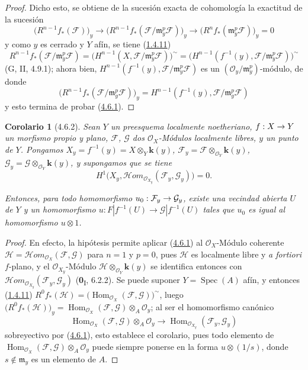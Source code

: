 \documentclass[10pt,oneside,openany]{book}
\theoremstyle{egaenv}\newtheorem*{env}{---}
\theoremstyle{egastatement}
\newtheorem*{corollary}{Corolario}
\theoremstyle{egadescription}
\renewcommand{\to}{\mathchoice{\longrightarrow}{\rightarrow}{\rightarrow}{\rightarrow}}
\begin{document}
\begin{proof}
Dicho esto, se obtiene de la sucesión exacta de cohomología la exactitud de la
sucesión
\[
\bigl(R^{n-1}f_*(\mathcal F)\bigr)_y
\longrightarrow
\bigl(R^{n-1}f_*(\mathcal F/\mathfrak m_y^p\mathcal F)\bigr)_y
\longrightarrow
\bigl(R^nf_*(\mathfrak m_y^p\mathcal F)\bigr)_y=0
\]
y como $y$ es cerrado y $Y$ afín, se tiene (\hyperref[III.1.4.11-fr]{1.4.11})
\[
R^{n-1}f_*(\mathcal F/\mathfrak m_y^p\mathcal F)
=\bigl(H^{n-1}(X,\mathcal F/\mathfrak m_y^p\mathcal F)\bigr)^\sim
=\bigl(H^{n-1}(f^{-1}(y),
\mathcal F/\mathfrak m_y^p\mathcal F)\bigr)^\sim
\]
(G, II, 4.9.1); ahora bien,
$H^{n-1}(f^{-1}(y),\mathcal F/\mathfrak m_y^p\mathcal F)$ es un
$(\mathcal O_y/\mathfrak m_y^p)$-módulo, de donde
\[
\bigl(R^{n-1}f_*(\mathcal F/\mathfrak m_y^p\mathcal F)\bigr)_y
=H^{n-1}(f^{-1}(y),\mathcal F/\mathfrak m_y^p\mathcal F)
\]
y esto termina de probar (\hyperref[III.4.6.1-fr]{4.6.1}).
\end{proof}

\begin{corollary}[4.6.2]
\label{III.4.6.2-fr}
Sean $Y$ un preesquema localmente noetheriano, $f:X\to Y$ un morfismo propio
y plano, $\mathcal F$, $\mathcal G$ dos $\mathcal O_X$-Módulos localmente
libres, $y$ un punto de $Y$. Pongamos
$X_y=f^{-1}(y)=X\otimes_Y\boldsymbol{k}(y)$,
$\mathcal F_y=\mathcal F\otimes_{\mathcal O_Y}\boldsymbol{k}(y)$,
$\mathcal G_y=\mathcal G\otimes_{\mathcal O_Y}\boldsymbol{k}(y)$,
y supongamos que se tiene
\[
\label{III.4.6.2.1-fr}
H^1\bigl(X_y,
\mathcal{H}\!om_{\mathcal O_{X_y}}(\mathcal F_y,\mathcal G_y)\bigr)=0.
\tag{4.6.2.1}
\]

Entonces, para todo homomorfismo $u_0:\mathcal F_y\to\mathcal G_y$, existe
una vecindad abierta $U$ de $Y$ y un homomorfismo
$u:F|f^{-1}(U)\longrightarrow\mathcal G|f^{-1}(U)$
tales que $u_0$ es igual al homomorfismo $u\otimes1$.
\end{corollary}

\begin{proof}
En efecto, la hipótesis permite aplicar (\hyperref[III.4.6.1-fr]{4.6.1}) al
$\mathcal O_X$-Módulo coherente
$\mathcal H=\mathcal{H}\!om_{\mathcal O_X}(\mathcal F,\mathcal G)$ para
$n=1$ y $p=0$, pues $\mathcal H$ es localmente libre y \emph{a fortiori}
$f$-plano, y el $\mathcal O_{X_y}$-Módulo
$\mathcal H\otimes_{\mathcal O_Y}\boldsymbol{k}(y)$ se identifica entonces con
$\mathcal{H}\!om_{\mathcal O_{X_y}}(\mathcal F_y,\mathcal G_y)$
(\textbf{0}\textsubscript{I}, 6.2.2). Se puede suponer $Y=\operatorname{Spec}(A)$
afín, y entonces (\hyperref[III.1.4.11-fr]{1.4.11})
$R^0f_*(\mathcal H)=
\bigl(\operatorname{Hom}_{\mathcal O_X}(\mathcal F,\mathcal G)\bigr)^\sim$,
luego
$\bigl(R^0f_*(\mathcal H)\bigr)_y
=\operatorname{Hom}_{\mathcal O_X}(\mathcal F,\mathcal G)
\otimes_A\mathcal O_y$;
al ser el homomorfismo canónico
\[
\operatorname{Hom}_{\mathcal O_X}(\mathcal F,\mathcal G)
\otimes_A\mathcal O_y
\longrightarrow
\operatorname{Hom}_{\mathcal O_{X_y}}(\mathcal F_y,\mathcal G_y)
\]
sobreyectivo por (\hyperref[III.4.6.1-fr]{4.6.1}), esto establece el
corolario, pues todo elemento de
$\operatorname{Hom}_{\mathcal O_X}(\mathcal F,\mathcal G)
\otimes_A\mathcal O_y$ puede siempre ponerse en la forma
$u\otimes(1/s)$, donde $s\notin\mathfrak m_y$ es un elemento de $A$.
\end{proof}
\end{document}
